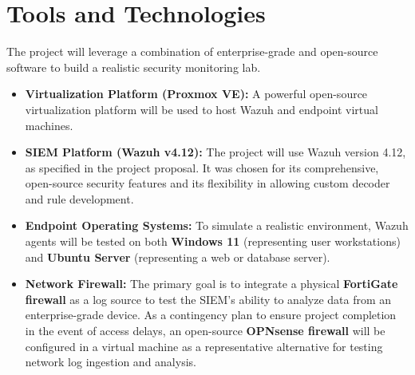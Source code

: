 \section{Tools and Technologies}
\label{sec:tools}
The project will leverage a combination of enterprise-grade and open-source software to build a realistic security monitoring lab.
\begin{itemize}
    \item \textbf{Virtualization Platform (Proxmox VE):} A powerful open-source virtualization platform will be used to host Wazuh and endpoint virtual machines.
     \item \textbf{SIEM Platform (Wazuh v4.12):} The project will use Wazuh version 4.12, as specified in the project proposal. It was chosen for its comprehensive, open-source security features and its flexibility in allowing custom decoder and rule development.
    \item \textbf{Endpoint Operating Systems:} To simulate a realistic environment, Wazuh agents will be tested on both \textbf{Windows 11} (representing user workstations) and \textbf{Ubuntu Server } (representing a web or database server).
    \item \textbf{Network Firewall:} The primary goal is to integrate a physical \textbf{FortiGate firewall} as a log source to test the SIEM's ability to analyze data from an enterprise-grade device. As a contingency plan to ensure project completion in the event of access delays, an open-source \textbf{OPNsense firewall} will be configured in a virtual machine as a representative alternative for testing network log ingestion and analysis.
\end{itemize}

